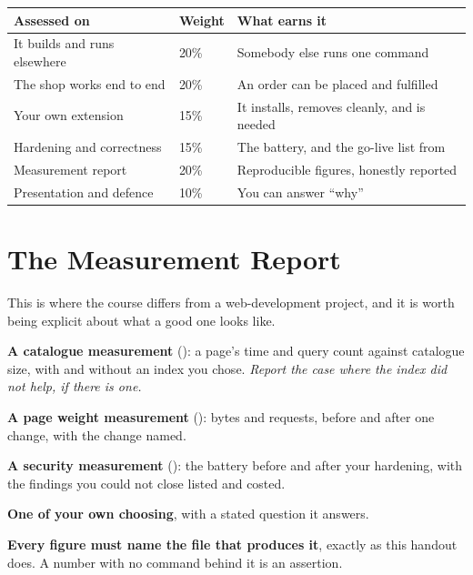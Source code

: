 \begin{longtable}{@{}L{5.6cm}L{2.0cm}L{6.6cm}@{}}
\toprule
{}
\textbf{Assessed on} & \textbf{Weight} & \textbf{What earns it} \\
\midrule
\endhead
It builds and runs elsewhere & 20\% & Somebody else runs one command \\
The shop works end to end & 20\% & An order can be placed and fulfilled \\
Your own extension & 15\% & It installs, removes cleanly, and is needed \\
Hardening and correctness & 15\% & The  battery, and the
go-live list from  \\
Measurement report & 20\% & Reproducible figures, honestly reported \\
Presentation and defence & 10\% & You can answer ``why'' \\
\bottomrule
\end{longtable}

\section{The Measurement Report}

This is where the course differs from a web-development project, and it is
worth being explicit about what a good one looks like.

\begin{conceptbox}
\begin{tightnum}
  \item \textbf{A catalogue measurement} (): a page's time and
        query count against catalogue size, with and without an index you
        chose. \emph{Report the case where the index did not help, if there is
        one.}
  \item \textbf{A page weight measurement} (): bytes and requests,
        before and after one change, with the change named.
  \item \textbf{A security measurement} (): the battery before
        and after your hardening, with the findings you could not close listed
        and costed.
  \item \textbf{One of your own choosing}, with a stated question it answers.
\end{tightnum}

\smallskip
\textbf{Every figure must name the file that produces it}, exactly as this
handout does. A number with no command behind it is an assertion.
\end{conceptbox}

